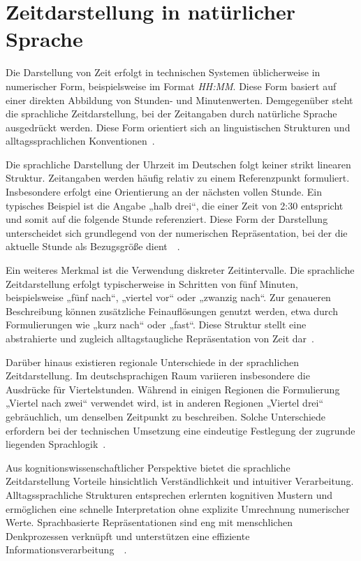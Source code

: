 \section{Zeitdarstellung in natürlicher Sprache}
Die Darstellung von Zeit erfolgt in technischen Systemen üblicherweise in numerischer Form, beispielsweise im Format \textit{HH:MM}.
Diese Form basiert auf einer direkten Abbildung von Stunden- und Minutenwerten.
Demgegenüber steht die sprachliche Zeitdarstellung, bei der Zeitangaben durch natürliche Sprache ausgedrückt werden.
Diese Form orientiert sich an linguistischen Strukturen und alltagssprachlichen Konventionen~\cite[S.~14--35]{klein1994time}.

Die sprachliche Darstellung der Uhrzeit im Deutschen folgt keiner strikt linearen Struktur.
Zeitangaben werden häufig relativ zu einem Referenzpunkt formuliert.
Insbesondere erfolgt eine Orientierung an der nächsten vollen Stunde.
Ein typisches Beispiel ist die Angabe „halb drei“, die einer Zeit von 2:30 entspricht und somit auf die folgende Stunde referenziert.
Diese Form der Darstellung unterscheidet sich grundlegend von der numerischen Repräsentation, bei der die aktuelle Stunde als Bezugsgröße dient~\cite[S.~36]{klein1994time}~\cite[S.~xv]{lakoff1987women}.

Ein weiteres Merkmal ist die Verwendung diskreter Zeitintervalle.
Die sprachliche Zeitdarstellung erfolgt typischerweise in Schritten von fünf Minuten, beispielsweise „fünf nach“, „viertel vor“ oder „zwanzig nach“.
Zur genaueren Beschreibung können zusätzliche Feinauflösungen genutzt werden, etwa durch Formulierungen wie „kurz nach“ oder „fast“.
Diese Struktur stellt eine abstrahierte und zugleich alltagstaugliche Repräsentation von Zeit dar~\cite[S.~208\,ff.]{langacker1987foundations}.

Darüber hinaus existieren regionale Unterschiede in der sprachlichen Zeitdarstellung.
Im deutschsprachigen Raum variieren insbesondere die Ausdrücke für Viertelstunden.
Während in einigen Regionen die Formulierung „Viertel nach zwei“ verwendet wird, ist in anderen Regionen „Viertel drei“ gebräuchlich, um denselben Zeitpunkt zu beschreiben.
Solche Unterschiede erfordern bei der technischen Umsetzung eine eindeutige Festlegung der zugrunde liegenden Sprachlogik~\cite[S.~212]{kucharczyk2012sprachliche}.

Aus kognitionswissenschaftlicher Perspektive bietet die sprachliche Zeitdarstellung Vorteile hinsichtlich Verständlichkeit und intuitiver Verarbeitung.
Alltagssprachliche Strukturen entsprechen erlernten kognitiven Mustern und ermöglichen eine schnelle Interpretation ohne explizite Umrechnung numerischer Werte.
Sprachbasierte Repräsentationen sind eng mit menschlichen Denkprozessen verknüpft und unterstützen eine effiziente Informationsverarbeitung~\cite[S.~15--18]{pinker1994language}~\cite[S.~xv]{lakoff1987women}.

